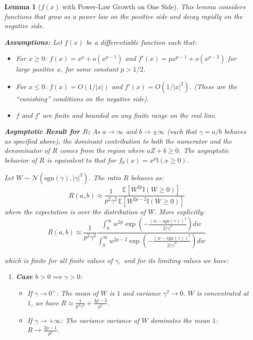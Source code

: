 \documentclass[11pt]{article}
\newtheorem{lemma}{Lemma}
\begin{document}
\begin{lemma}[$f(x)$ with Power-Law Growth on One Side]
This lemma considers functions that grow as a power law on the positive side and decay rapidly on the negative side.

\textbf{Assumptions:}
Let $f(x)$ be a differentiable function such that:
\begin{itemize}
    \item[\textbf{(A1)}] For $x \ge 0$: $f(x) = x^p + o(x^{p-1})$ and $f'(x) = px^{p-1} + o(x^{p-2})$ for large positive $x$, for some constant $p > 1/2$. 
    \item[\textbf{(A2)}] For $x \le 0$: $f(x) = O(1/|x|)$ and $f'(x) = O(1/|x|^2)$. (These are the ``vanishing'' conditions on the negative side).
    \item[\textbf{(A3)}] $f$ and $f'$ are finite and bounded on any finite range on the real line. 
\end{itemize}

\textbf{Asymptotic Result for $R$:}
As $a \to \infty$ and $b \to \pm\infty$ (such that $\gamma=a/b$ behaves as specified above), the dominant contribution to both the numerator and the denominator of $R$ comes from the region where $aZ+b \ge 0$. The asymptotic behavior of $R$ is equivalent to that for $f_0(x) = x^p \mathbb{I}(x \ge 0)$.

Let $W \sim \mathcal{N}(\text{sgn}(\gamma), |\gamma|^2)$. The ratio $R$ behaves as:
$$R(a,b) \approx \frac{1}{p^2 \gamma^2} \frac{\mathbb{E}[W^{2p} \mathbb{I}(W \ge 0)]}{\mathbb{E}[W^{2p-2} \mathbb{I}(W \ge 0)]}$$
where the expectation is over the distribution of $W$. More explicitly:
$$R(a,b) \approx \frac{1}{p^2 \gamma^2} \frac{\int_0^\infty w^{2p} \exp\left(-\frac{(w - \text{sgn}(\gamma))^2}{2|\gamma|^2}\right) dw}{\int_0^\infty w^{2p-2} \exp\left(-\frac{(w - \text{sgn}(\gamma))^2}{2|\gamma|^2}\right) dw}$$

which is finite for all finite values of $\gamma,$ and for its limiting values we have:

\begin{enumerate}
    \item \textbf{Case $b>0 \implies \gamma > 0$}:
    \begin{itemize}
        \item If $\gamma \to 0^+$: The mean of $W$ is $1$ and variance $\gamma^2 \to 0$. $W$ is concentrated at $1$, we have $R \approx \frac{1}{p^2 \gamma^2} + \frac{4p-3}{p^2}$.
        \item If $\gamma \to +\infty$: The variance variance of $W$ dominates the mean $1$: $R \to \frac{2p-1}{p^2}$.
    \end{itemize}


\end{enumerate}
\end{lemma}
\end{document}
